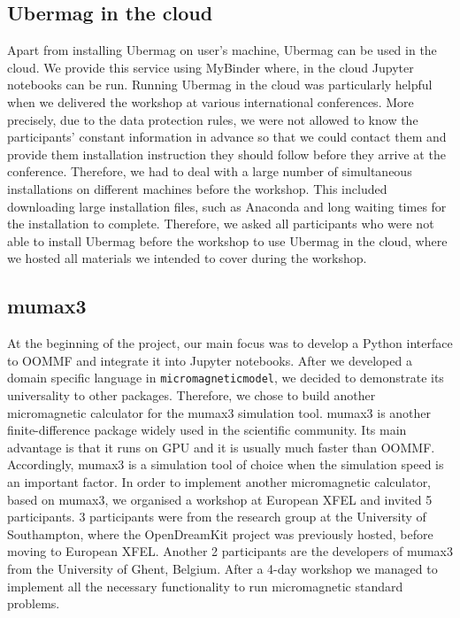 \documentclass{deliverablereport}
\begin{document}
\subsection{Ubermag in the cloud}

Apart from installing Ubermag on user's machine, Ubermag can be used in the cloud. We provide this service using MyBinder where, in the cloud Jupyter notebooks can be run. Running Ubermag in the cloud was particularly helpful when we delivered the workshop at various international conferences. More precisely, due to the data protection rules, we were not allowed to know the participants' constant information in advance so that we could contact them and provide them installation instruction they should follow before they arrive at the conference. Therefore, we had to deal with a large number of simultaneous installations on different machines before the workshop. This included downloading large installation files, such as Anaconda and long waiting times for the installation to complete. Therefore, we asked all participants who were not able to install Ubermag before the workshop to use Ubermag in the cloud, where we hosted all materials we intended to cover during the workshop.

\subsection{mumax3}

At the beginning of the project, our main focus was to develop a Python interface to OOMMF and integrate it into Jupyter notebooks. After we developed a domain specific language in \texttt{micromagneticmodel}, we decided to demonstrate its universality to other packages. Therefore, we chose to build another micromagnetic calculator for the mumax3 simulation tool. mumax3 is another finite-difference package widely used in the scientific community. Its main advantage is that it runs on GPU and it is usually much faster than OOMMF. Accordingly, mumax3 is a simulation tool of choice when the simulation speed is an important factor. In order to implement another micromagnetic calculator, based on mumax3, we organised a workshop at European XFEL and invited 5 participants. 3 participants were from the research group at the University of Southampton, where the OpenDreamKit project was previously hosted, before moving to European XFEL. Another 2 participants are the developers of mumax3 from the University of Ghent, Belgium. After a 4-day workshop we managed to implement all the necessary functionality to run micromagnetic standard problems.
\end{document}
